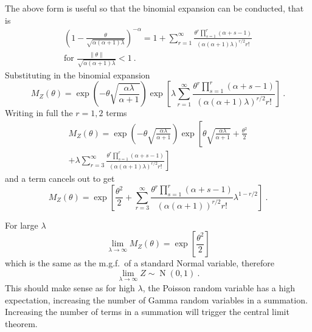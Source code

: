 \documentclass[12pt, a4paper]{memoir}
\DeclareMathOperator{\normal}{N}
\begin{document}
The above form is useful so that the binomial expansion can be conducted, that is
\begin{multline}
\left(
1-\frac{\theta}{\sqrt{\alpha(\alpha+1)\lambda}}
\right)^{-\alpha}
=
1+
\sum_{r=1}^\infty \frac{\theta^r\prod_{s=1}^r(\alpha+s-1)}{(\alpha(\alpha+1)\lambda)^{r/2}r!}
\\
\text{for }\frac{\|\theta\|}{\sqrt{\alpha(\alpha+1)\lambda}}<1 \ .
\end{multline}
Substituting in the binomial expansion
\begin{equation*}
M_Z(\theta)=\exp\left(-\theta\sqrt{\frac{\alpha\lambda}{\alpha+1}}\right)
\exp\left[
\lambda
\sum_{r=1}^\infty \frac{\theta^r\prod_{s=1}^r(\alpha+s-1)}{(\alpha(\alpha+1)\lambda)^{r/2}r!}
\right] \ .
\end{equation*}
Writing in full the $r=1,2$ terms
\begin{multline*}
M_Z(\theta)=\exp\left(-\theta\sqrt{\frac{\alpha\lambda}{\alpha+1}}\right)
\exp\left[
\theta\sqrt{\frac{\alpha\lambda}{\alpha+1}}
+\frac{\theta^2}{2}
\right.\\\left.
+\lambda\sum_{r=3}^\infty \frac{\theta^r\prod_{s=1}^r(\alpha+s-1)}{(\alpha(\alpha+1)\lambda)^{r/2}r!}
\right]
\end{multline*}
and a term cancels out to get
\begin{equation}
M_Z(\theta)=
\exp\left[
	\frac{\theta^2}{2}
	+\sum_{r=3}^\infty
		\frac{\theta^r
			\prod_{s=1}^r(\alpha+s-1)
		}
		{(\alpha(\alpha+1))^{r/2}r!}
		\lambda^{1-r/2}
\right] \ .
\end{equation}

For large $\lambda$
\begin{equation}
\lim_{\lambda\rightarrow\infty}M_Z(\theta)=\exp\left[\frac{\theta^2}{2}\right]
\end{equation}
which is the same as the m.g.f.~of a standard Normal variable, therefore
\begin{equation}
\lim_{\lambda\rightarrow\infty}Z\sim\normal(0,1) \ .
\end{equation}
This should make sense as for high $\lambda$, the Poisson random variable has a high expectation, increasing the number of Gamma random variables in a summation. Increasing the number of terms in a summation will trigger the central limit theorem.
\end{document}
